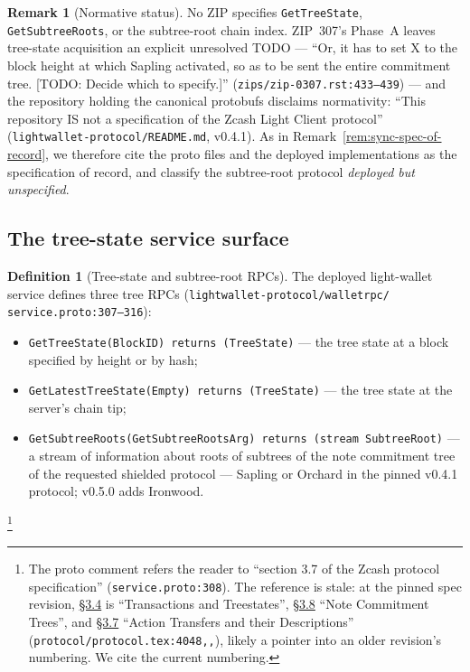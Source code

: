 \documentclass[11pt,a4paper]{article}
\theoremstyle{definition}
\newtheorem{definition}[theorem]{Definition}
\newtheorem{remark}[theorem]{Remark}
\begin{document}
\begin{remark}[Normative status]\label{rem:sync-tree-normative}
No ZIP specifies \texttt{GetTreeState}, \texttt{GetSubtreeRoots}, or the
subtree-root chain index. ZIP~307's Phase~A leaves tree-state acquisition
an explicit unresolved TODO --- ``Or, it has to set X to the block height
at which Sapling activated, so as to be sent the entire commitment tree.
[TODO: Decide which to specify.]''
(\texttt{zips/zip-0307.rst:433--439}) --- and the repository holding the
canonical protobufs disclaims normativity: ``This repository IS not a
specification of the Zcash Light Client protocol''
(\texttt{lightwallet-protocol/README.md}, v0.4.1). As in
Remark~\ref{rem:sync-spec-of-record}, we therefore cite the proto files
and the deployed implementations as the specification of record, and
classify the subtree-root protocol \emph{deployed but unspecified}.
\end{remark}

\subsection{The tree-state service surface}\label{sec:sync-tree-rpcs}

\begin{definition}[Tree-state and subtree-root RPCs]\label{def:sync-tree-rpcs}
The deployed light-wallet service defines three tree RPCs
(\texttt{lightwallet-protocol/walletrpc/}\allowbreak
\texttt{service.proto:307--316}):
\begin{itemize}
\item \texttt{GetTreeState(BlockID) returns (TreeState)} --- the tree
  state at a block specified by height or by hash;
\item \texttt{GetLatestTreeState(Empty) returns (TreeState)} --- the
  tree state at the server's chain tip;
\item \texttt{GetSubtreeRoots(GetSubtreeRootsArg) returns (stream
  SubtreeRoot)} --- a stream of information about roots of subtrees of
  the note commitment tree of the requested shielded protocol ---
  Sapling or Orchard in the pinned v0.4.1 protocol; v0.5.0 adds Ironwood.
\end{itemize}%
\footnote{The proto comment refers the reader to ``section 3.7 of the
Zcash protocol specification''
(\texttt{service.proto:308}). The reference is stale: at the pinned spec
revision, \href{https://zips.z.cash/protocol/protocol.pdf\#transactions}{\S3.4} is ``Transactions and Treestates'', \href{https://zips.z.cash/protocol/protocol.pdf\#notecommitmenttrees}{\S3.8} ``Note
Commitment Trees'', and \href{https://zips.z.cash/protocol/protocol.pdf\#actions}{\S3.7} ``Action Transfers and their
Descriptions''
(\texttt{protocol/protocol.tex:4048,,}),
likely a
pointer into an older revision's numbering. We cite the current
numbering.}
\end{definition}
\end{document}
